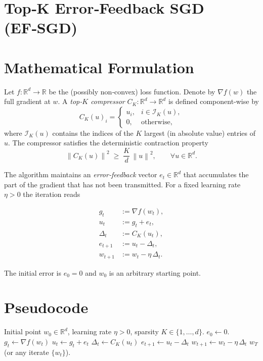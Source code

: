 \documentclass{article}
\newcommand{\R}{\mathbb{R}}
\newcommand{\norm}[1]{\left\|#1\right\|}
\begin{document}
\section*{Top‑K Error‑Feedback SGD (EF‑SGD)}

\section*{Mathematical Formulation}
Let $f:\R^{d}\rightarrow\R$ be the (possibly non‑convex) loss function.  
Denote by $\nabla f(w)$ the full gradient at $w$.  
A \emph{top‑$K$ compressor} $C_{K}:\R^{d}\rightarrow\R^{d}$ is defined component‑wise by
\[
C_{K}(u)_i=
\begin{cases}
u_i, & i\in\mathcal{I}_{K}(u),\\[2mm]
0,   & \text{otherwise},
\end{cases}
\]
where $\mathcal{I}_{K}(u)$ contains the indices of the $K$ largest (in absolute value) entries of $u$.  
The compressor satisfies the deterministic contraction property
\begin{equation}
\label{eq:topk-contraction}
\norm{C_{K}(u)}^{2}\;\ge\;\frac{K}{d}\,\norm{u}^{2},
\qquad\forall u\in\R^{d}.
\end{equation}

The algorithm maintains an \emph{error‑feedback} vector $e_t\in\R^{d}$ that accumulates the part of the gradient that has not been transmitted.  
For a fixed learning rate $\eta>0$ the iteration reads

\begin{align}
g_t &:= \nabla f(w_t), \label{eq:grad}\\
u_t &:= g_t + e_t, \label{eq:precompress}\\
\Delta_t &:= C_{K}(u_t), \label{eq:compress}\\
e_{t+1} &:= u_t - \Delta_t, \label{eq:error-update}\\
w_{t+1} &:= w_t - \eta \,\Delta_t . \label{eq:weight-update}
\end{align}

The initial error is $e_0=0$ and $w_0$ is an arbitrary starting point.

\section*{Pseudocode}
\begin{algorithm}[H]
\caption{Top‑K Error‑Feedback SGD}
\begin{algorithmic}[1]
\Require Initial point $w_0\in\R^{d}$, learning rate $\eta>0$, sparsity $K\in\{1,\dots,d\}$.
\State $e_0\gets 0$.
    \State $g_t \gets \nabla f(w_t)$ 
    \State $u_t \gets g_t + e_t$ 
    \State $\Delta_t \gets C_{K}(u_t)$ 
    \State $e_{t+1} \gets u_t - \Delta_t$ 
    \State $w_{t+1} \gets w_t - \eta\,\Delta_t$ 
\EndFor
\State \Return $w_T$ (or any iterate $\{w_t\}$).
\end{algorithmic}
\end{algorithm}
\end{document}
